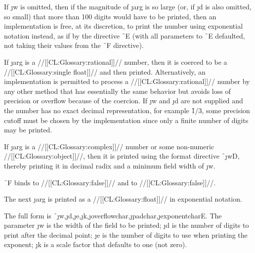 If \j{w} is omitted, then if the magnitude of \j{arg} is so large (or, if \j{d} is also omitted, so small) that more than 100 digits would have to be printed, then an implementation is free, at its discretion, to print the number using exponential notation instead, as if by the directive \f{~E} (with all parameters to \f{~E} defaulted, not taking their values from the \f{~F} directive).

If \j{arg} is a //[[CL:Glossary:rational]]//  number, then it is coerced to be a //[[CL:Glossary:single float]]// and then printed.  Alternatively, an implementation is permitted to process a //[[CL:Glossary:rational]]//  number by any other method that has essentially the same behavior but avoids loss of precision or overflow because of the coercion.  If \j{w} and \j{d} are not supplied and the number has no exact decimal representation, for example \f{1/3}, some precision cutoff must be chosen by the implementation since only a finite number of digits may be printed.

If \j{arg} is a //[[CL:Glossary:complex]]// number or some non-numeric //[[CL:Glossary:object]]//,  then it is printed using the format directive \f{~\j{w}D}, thereby printing it in decimal radix and a minimum field width of \j{w}.

 \f{~F} binds
     to //[[CL:Glossary:false]]// 
 and  to //[[CL:Glossary:false]]//.

\endsubsubsection%

 

The next \j{arg} is printed as a //[[CL:Glossary:float]]// in exponential notation.

The full form is \f{~\j{w},\j{d},\j{e},\j{k},\j{overflowchar},\j{padchar},\j{exponentchar}E}. The parameter \j{w} is the width of the field to be printed; \j{d} is the number of digits to print after the decimal point; \j{e} is the number of digits to use when printing the exponent; \j{k} is a scale factor that defaults to one (not zero).

